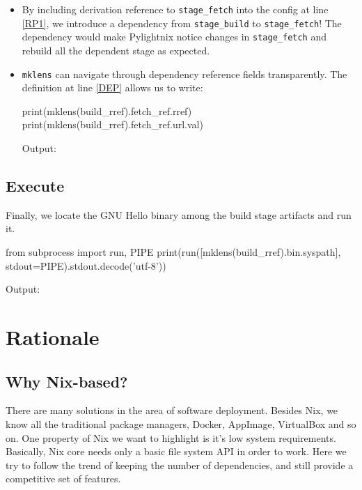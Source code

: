 \documentclass{article}
\newenvironment{pythontexcode}
  {\VerbatimEnvironment\begin{mdframed}[leftline=false,rightline=false]\begin{pyblock}[stdout][numbers=left]}
  {\end{pyblock}\end{mdframed}}
\newcommand{\mystdout}{\begin{mdframed}\small{\texttt{\stdoutpythontex[verbatim][breaklines,breakafter=0123456789-/]}}\end{mdframed}}
\newcommand{\mysmallstdout}{\begin{mdframed}\footnotesize{\texttt{\stdoutpythontex[verbatim][breaklines,breakafter=0123456789-/]}}\end{mdframed}}
\begin{document}
\begin{itemize}
  \item By including derivation reference to \texttt{stage\_fetch} into
    the config at line \ref{RP1}, we introduce a dependency from
    \texttt{stage\_build} to \texttt{stage\_fetch}! The dependency would
    make Pylightnix notice changes in \texttt{stage\_fetch} and rebuild all
    the dependent stage as expected.

  \item \texttt{mklens} can navigate through dependency reference fields
    transparently. The definition at line \ref{DEP} allows us to write:

    \begin{pythontexcode}
    print(mklens(build_rref).fetch_ref.rref)
    print(mklens(build_rref).fetch_ref.url.val)
    \end{pythontexcode}

    Output:

    \mysmallstdout

\end{itemize}


\pagebreak
\subsection{Execute}

Finally, we locate the GNU Hello binary among the build stage artifacts and
run it.

\begin{pythontexcode}
from subprocess import run, PIPE
print(run([mklens(build_rref).bin.syspath], stdout=PIPE).stdout.decode('utf-8'))
\end{pythontexcode}

Output:

\mystdout

\section{Rationale}

\subsection{Why Nix-based?}

There are many solutions in the area of software deployment.
Besides Nix, we know all the traditional package managers, Docker, AppImage,
VirtualBox and so on. One property of Nix we want to highlight is it's low
system requirements. Basically, Nix core needs only a basic file system API
in order to work. Here we try to follow the trend of keeping the number of
dependencies, and still provide a competitive set of features.
\end{document}
